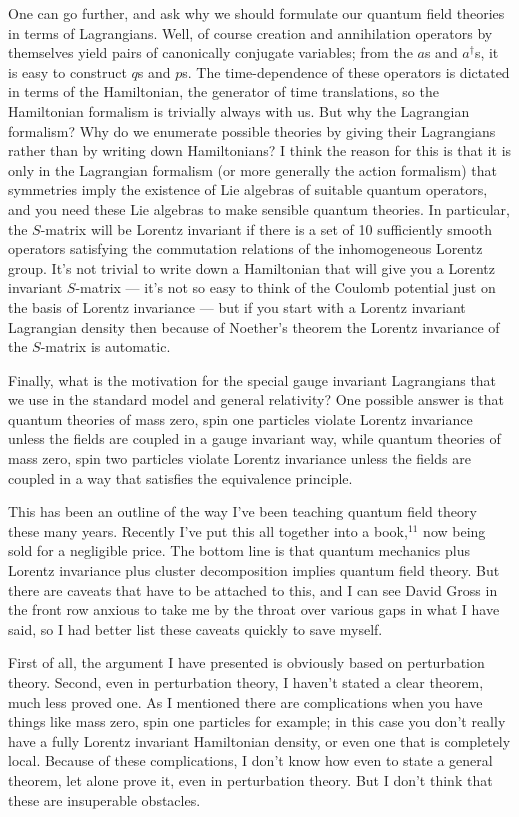 \documentclass[12pt]{article}
\begin{document}
One can go further, and ask why we should formulate our
quantum field theories in terms of Lagrangians.    Well, of
course creation and annihilation operators by themselves
yield pairs of canonically conjugate  variables; from the
$a$s and $a^\dagger$s, it is easy to  construct $q$s and
$p$s.  The time-dependence of these operators is dictated in
terms of the Hamiltonian, the generator of time
translations, so the Hamiltonian formalism is trivially
always with us.  But why the Lagrangian formalism?  Why do
we enumerate possible theories by giving their Lagrangians
rather than by writing down Hamiltonians?  I think the
reason for this is that it is only in the Lagrangian
formalism (or more generally the action formalism)  that
symmetries imply the existence of Lie algebras of suitable
quantum operators, and you need these Lie algebras to make
sensible quantum theories.  In particular, the $S$-matrix
will be Lorentz invariant if there is a set of 10
sufficiently smooth operators satisfying the commutation
relations of the inhomogeneous Lorentz group.  It's not
trivial to write down a Hamiltonian that will give you a
Lorentz invariant $S$-matrix --- it's not so easy to think
of the Coulomb potential just on the basis of Lorentz
invariance --- but if you start with a Lorentz invariant
Lagrangian density then because of Noether's theorem the
Lorentz invariance of the $S$-matrix is automatic.

Finally, what is the motivation for  the special gauge
invariant Lagrangians that we use in the standard model and
general relativity?  One possible answer is that quantum
theories of  mass zero, spin one particles violate Lorentz
invariance unless the fields are coupled in a gauge
invariant way, while quantum theories of mass zero, spin two
particles violate Lorentz invariance unless the fields are
coupled in a way that satisfies the equivalence principle.

This has been an outline of the way I've been teaching
quantum field theory these many years.  Recently I've put
this all together into a book,$^{11}$ now being sold for a
negligible price.   The bottom line is that
quantum mechanics plus Lorentz invariance plus cluster
decomposition implies quantum field theory.  But there are
caveats that have to be attached to this, and I can see
David Gross in the front row anxious to take me by the
throat over various gaps in what I have said, so I had
better list these caveats quickly to save myself.

First of all, the argument I have presented is obviously
based on perturbation theory.  Second, even in perturbation
theory, I haven't stated a clear theorem, much less proved
one.  As I mentioned there are complications when you have
things like mass zero, spin one particles for example; in
this case you don't really have a fully Lorentz invariant
Hamiltonian density, or even one that is completely local.
Because of these complications, I don't know how even to
state a general theorem, let alone prove it, even in
perturbation theory.  But I don't think that these are
insuperable obstacles.
\end{document}

